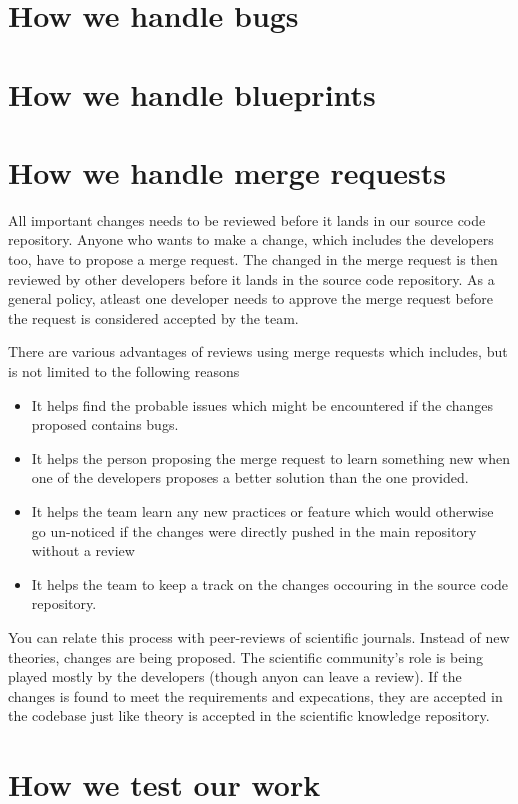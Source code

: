 \section{How we handle bugs}
\section{How we handle blueprints}
\section{How we handle merge requests}

All important changes needs to be reviewed before it lands in our source 
code repository. Anyone who wants to make a change, which includes the 
developers too, have to propose a merge request. The changed in the merge 
request is then reviewed by other developers before it lands in the source 
code repository. As a general policy, atleast one developer needs to approve 
the merge request before the request is considered accepted by the team.

There are various advantages of reviews using merge requests which includes, 
but is not limited to the following reasons

\begin{itemize}
\item It helps find the probable issues which might be encountered if the 
changes proposed contains bugs.
\item It helps the person proposing the merge request to learn something new 
when one of the developers proposes a better solution than the one provided.
\item It helps the team learn any new practices or feature which would 
otherwise go un-noticed if the changes were directly pushed in the main 
repository without a review
\item It helps the team to keep a track on the changes occouring in the source 
code repository.
\end{itemize}

You can relate this process with peer-reviews of scientific journals. Instead of 
new theories, changes are being proposed. The scientific community's role is being 
played mostly by the developers (though anyon can leave a review). If the changes 
is found to meet the requirements and expecations, they are accepted in the 
codebase just like theory is accepted in the scientific knowledge repository.

\section{How we test our work}
